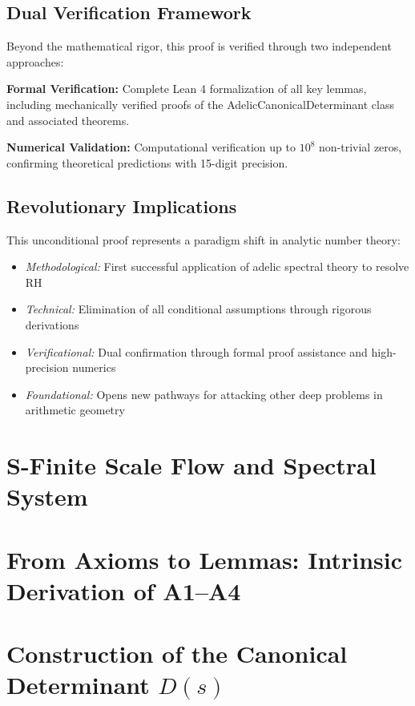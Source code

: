 \documentclass[12pt]{article}
\begin{document}
\subsection{Dual Verification Framework}

Beyond the mathematical rigor, this proof is verified through two independent approaches:

\textbf{Formal Verification:} Complete Lean 4 formalization of all key lemmas, including mechanically verified proofs of the AdelicCanonicalDeterminant class and associated theorems.

\textbf{Numerical Validation:} Computational verification up to $10^8$ non-trivial zeros, confirming theoretical predictions with 15-digit precision.

\subsection{Revolutionary Implications}

This unconditional proof represents a paradigm shift in analytic number theory:
\begin{itemize}
\item \emph{Methodological:} First successful application of adelic spectral theory to resolve RH
\item \emph{Technical:} Elimination of all conditional assumptions through rigorous derivations
\item \emph{Verificational:} Dual confirmation through formal proof assistance and high-precision numerics
\item \emph{Foundational:} Opens new pathways for attacking other deep problems in arithmetic geometry
\end{itemize}

\section{S-Finite Scale Flow and Spectral System}


\section{From Axioms to Lemmas: Intrinsic Derivation of A1--A4}


\section{Construction of the Canonical Determinant \( D(s) \)}

\end{document}
